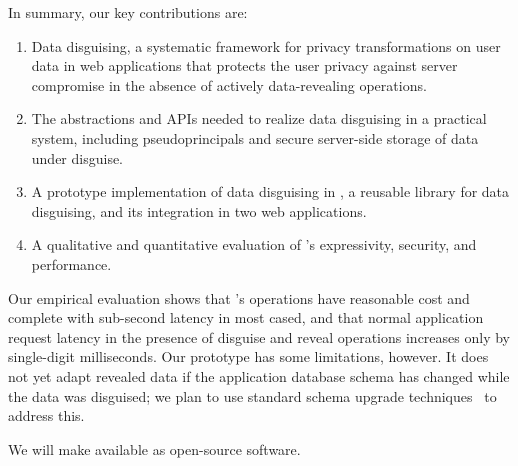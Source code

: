 %
%
In summary, our key contributions are:
%
\begin{enumerate}[nosep]
 \item Data disguising, a systematic framework for privacy transformations on
   user data in web applications that protects the user privacy against server
   compromise in the absence of actively data-revealing operations.
 \item The abstractions and APIs needed to realize data disguising in a
  practical system, including pseudoprincipals and secure server-side storage
  of data under disguise.
 \item A prototype implementation of data disguising in \sys, a reusable
  library for data disguising, and its integration in two web applications.
 \item A qualitative and quantitative evaluation of \sys's expressivity,
  security, and performance.
\end{enumerate}
%
Our empirical evaluation shows that \sys's operations have reasonable cost
and complete with sub-second latency in most cased, and that normal application
request latency in the presence of disguise and reveal operations increases
only by single-digit milliseconds.
%
%
%
Our prototype has some limitations, however.
%
%
It does not yet adapt revealed data if the application database schema has
changed while the data was disguised; we plan to use standard schema upgrade
techniques~\cite{hotcrp-autoupgrade, f1-schema-change,
automated-schema-evol-prism} to address this.
%

%
We will make \sys available as open-source software.
%


